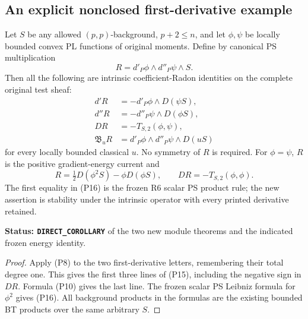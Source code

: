 \subsection{An explicit nonclosed first-derivative example}

\begin{corollary}
\label{cor:r10-nonsymmetric-PL-gradient-product}
Let $S$ be any allowed $(p,p)$-background, $p+2\le n$,
and let $\phi,\psi$ be locally bounded convex PL functions
of original moments.  Define by canonical PS multiplication
\[
                         R=d'_P\phi\wedge d''_P\psi\wedge S.
 \tag{P14}
\]
Then all the following are intrinsic coefficient-Radon
identities on the complete original test sheaf:
\[
 \begin{split}
 d'R&=-d'_P\phi\wedge D(\psi S),\\
 d''R&=-d''_P\psi\wedge D(\phi S),\\
 DR&=-T_{S,2}(\phi,\psi),\\
 \mathfrak B_uR&=
          d'_P\phi\wedge d''_P\psi\wedge D(uS)
 \end{split}
 \tag{P15}
\]
for every locally bounded classical $u$.  No symmetry of
$R$ is required.  For $\phi=\psi$, $R$ is the positive
gradient-energy current and
\[
 R=\tfrac12D(\phi^2S)-\phi D(\phi S),\qquad
                         DR=-T_{S,2}(\phi,\phi).
 \tag{P16}
\]
The first equality in (P16) is the frozen R6 scalar PS
product rule; the new assertion is stability under the
intrinsic operator with every printed derivative retained.
\end{corollary}

\noindent\textbf{Status: \texttt{DIRECT\_COROLLARY}} of
the two new module theorems and the indicated frozen energy
identity.

\begin{proof}
Apply (P8) to the two first-derivative letters, remembering
their total degree one.  This gives the first three lines
of (P15), including the negative sign in $DR$.
Formula (P10) gives the last line.  The frozen scalar
PS Leibniz formula for $\phi^2$ gives (P16).
All background products in the formulas are the existing
bounded BT products over the same arbitrary $S$.
\end{proof}

